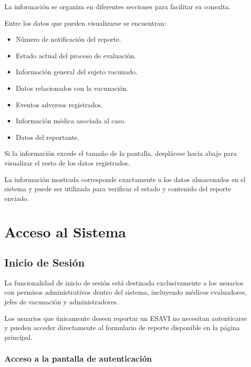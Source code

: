 \documentclass[12pt,a4paper]{report}
\begin{document}
La información se organiza en diferentes secciones para facilitar su consulta.

Entre los datos que pueden visualizarse se encuentran:

\begin{itemize}
\item Número de notificación del reporte.
\item Estado actual del proceso de evaluación.
\item Información general del sujeto vacunado.
\item Datos relacionados con la vacunación.
\item Eventos adversos registrados.
\item Información médica asociada al caso.
\item Datos del reportante.
\end{itemize}

Si la información excede el tamaño de la pantalla, desplácese hacia abajo para visualizar el resto de los datos registrados.

La información mostrada corresponde exactamente a los datos almacenados en el sistema y puede ser utilizada para verificar el estado y contenido del reporte enviado.

	

	
	\chapter{Acceso al Sistema}
	
	\section{Inicio de Sesión}

La funcionalidad de inicio de sesión está destinada exclusivamente a los usuarios con permisos administrativos dentro del sistema, incluyendo médicos evaluadores, jefes de vacunación y administradores.

Los usuarios que únicamente deseen reportar un ESAVI no necesitan autenticarse y pueden acceder directamente al formulario de reporte disponible en la página principal.

\subsection{Acceso a la pantalla de autenticación}
\end{document}
